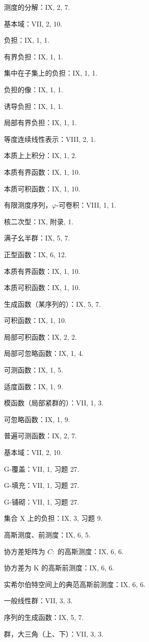 测度的分解：IX, 2, 7.

基本域：VII, 2, 10.

负担：IX, 1, 1.

有界负担：IX, 1, 1.

集中在子集上的负担：IX, 1, 1.

负担的像：IX, 1, 1.

诱导负担：IX, 1, 1.

局部有界负担：IX, 1, 1.

等度连续线性表示：VIII, 2, 1.

本质上上积分：IX, 1, 2.

本质有界函数：IX, 1, 10.

本质可积函数：IX, 1, 10.

有限测度序列，\(\varphi\)-可卷积：VIII, 1, 1.

核二次型：IX, 附录, 1.

满子幺半群：IX, 5, 7.

正型函数：IX, 6, 12.

本质有界函数：IX, 1, 10.

本质可积函数：IX, 1, 10.

生成函数（某序列的）：IX, 5, 7.

可积函数：IX, 1, 10.

局部可积函数：IX, 2, 2.

局部可忽略函数：IX, 1, 4.

可测函数：IX, 1, 5.

适度函数：IX, 1, 9.

模函数（局部紧群的）：VII, 1, 3.

可忽略函数：IX, 1, 9.

普遍可测函数：IX, 2, 7.

基本域：VII, 2, 10.

G-覆盖：VII, 1, 习题 27.

G-填充：VII, 1, 习题 27.

G-铺砌：VII, 1, 习题 27.

集合 X 上的负担：IX, 3, 习题 9.

高斯测度、前测度：IX, 6, 5.

协方差矩阵为 \(C:\) 的高斯测度：IX, 6, 6.

协方差为 K 的高斯前测度：IX, 6, 6.

实希尔伯特空间上的典范高斯前测度：IX, 6, 6.

一般线性群：VII, 3, 3.

序列的生成函数：IX, 5, 7.

群，大三角（上、下）：VII, 3, 3.

